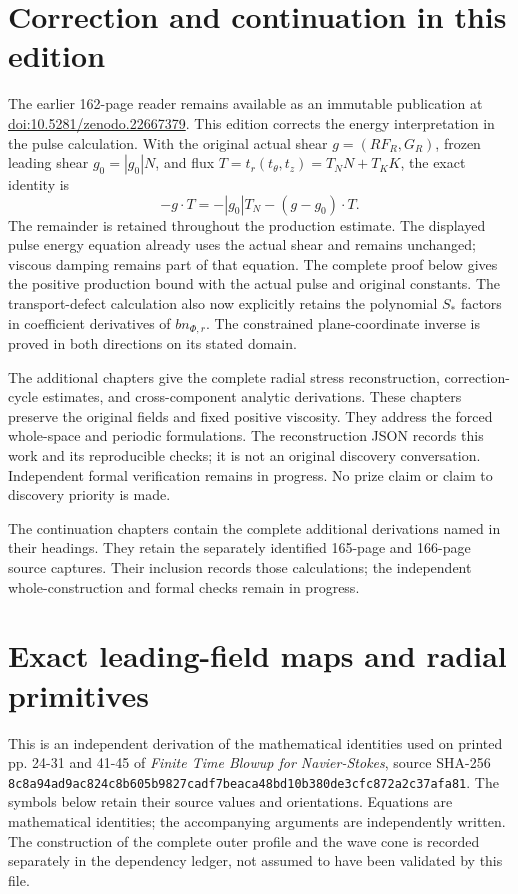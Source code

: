 \documentclass[10pt,a4paper]{article}
\begin{document}
\section{Correction and continuation in this edition}
The earlier 162-page reader remains available as an immutable publication at
\href{https://zenodo.org/records/22667379}{doi:10.5281/zenodo.22667379}.
This edition corrects the energy interpretation in the pulse calculation.
With the original actual shear $g=(RF_R,G_R)$, frozen leading shear
$g_0=|g_0|N$, and flux $T=t_r(t_\theta,t_z)=T_NN+T_KK$, the exact identity is
\[
 -g\cdot T=-|g_0|T_N-(g-g_0)\cdot T.
\]
The remainder is retained throughout the production estimate. The displayed
pulse energy equation already uses the actual shear and remains unchanged;
viscous damping remains part of that equation. The complete proof below gives
the positive production bound with the actual pulse and original constants.
The transport-defect calculation also now explicitly retains the polynomial
$S_*$ factors in coefficient derivatives of $bn_{\Phi,r}$. The constrained
plane-coordinate inverse is proved in both directions on its stated domain.

The additional chapters give the complete radial stress reconstruction,
correction-cycle estimates, and cross-component analytic derivations. These
chapters preserve the original fields and fixed positive viscosity. They
address the forced whole-space and periodic formulations. The reconstruction
JSON records this work and its reproducible checks; it is not an original
discovery conversation. Independent formal verification remains in progress.
No prize claim or claim to discovery priority is made.

\par
The continuation chapters contain the complete additional derivations named in
their headings. They retain the separately identified 165-page and 166-page
source captures. Their inclusion records those calculations; the independent
whole-construction and formal checks remain in progress.

\section{Exact leading-field maps and radial primitives}

This is an independent derivation of the mathematical identities used on printed pp. 24-31 and 41-45 of \emph{Finite Time Blowup for Navier-Stokes}, source SHA-256 \texttt{8c8a94ad}\allowbreak\texttt{9ac824c8}\allowbreak\texttt{b605b982}\allowbreak\texttt{7cadf7be}\allowbreak\texttt{aca48bd1}\allowbreak\texttt{0b380de3}\allowbreak\texttt{cfc872a2}\allowbreak\texttt{c37afa81}. The symbols below retain their source values and orientations. Equations are mathematical identities; the accompanying arguments are independently written. The construction of the complete outer profile and the wave cone is recorded separately in the dependency ledger, not assumed to have been validated by this file.
\end{document}
